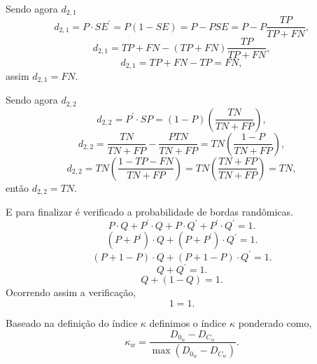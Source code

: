 Sendo agora $d_{2,1}$
\begin{equation}\nonumber
	d_{2,1}=P\cdot SE^{'} = P(1-SE)=P-PSE=P-P\frac{TP}{TP + FN},
\end{equation}
\begin{equation}\nonumber
	d_{2,1}=TP+FN-(TP + FN)\frac{TP}{TP + FN},
\end{equation}
\begin{equation}\label{cap_fusao_46}
	d_{2,1}=TP+FN-TP=FN,
\end{equation}
assim $d_{2,1} = FN$.

Sendo agora $d_{2,2}$
\begin{equation}\nonumber
	d_{2,2}=P^{'}\cdot SP = (1-P)\left(\frac{TN}{TN + FP}\right),
\end{equation}
\begin{equation}\nonumber
	d_{2,2}=\frac{TN}{TN + FP}-\frac{PTN}{TN + FP}=TN\left(\frac{1-P}{TN + FP}\right),
\end{equation}
\begin{equation}\label{cap_fusao_47}
	d_{2,2}=TN\left(\frac{1-TP-FN}{TN + FP}\right)=TN\left(\frac{TN+FP}{TN + FP}\right)=TN,
\end{equation}
então $d_{2,2}=TN$.


E para finalizar é verificado a probabilidade de bordas randômicas.
\begin{equation}\nonumber
	P\cdot Q + P^{'}\cdot Q+P\cdot Q^{'} + P^{'}\cdot Q^{'} = 1.
\end{equation}
\begin{equation}\nonumber
	(P + P^{'})\cdot Q + (P + P^{'}) \cdot Q^{'} = 1.
\end{equation}
\begin{equation}\nonumber
	(P + 1 -P)\cdot Q + (P + 1 - P) \cdot Q^{'} = 1.
\end{equation}
\begin{equation}\nonumber
	 Q +  Q^{'} = 1.
\end{equation}
\begin{equation}\nonumber
	 Q + (1 - Q) = 1.
\end{equation}
Ocorrendo assim a verificação,
\begin{equation}\nonumber
	 1 = 1.
\end{equation}


Baseado na definição do índice $\kappa$ definimos o índice $\kappa$ ponderado como,
\begin{equation}\label{cap_fusao_48}
\kappa_w = \frac{D_{0_w} - D_{C_w}}{\max(D_{0_w} - D_{C_w})}.
\end{equation}

